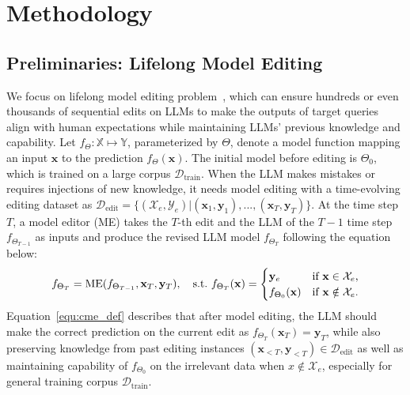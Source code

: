 \section{Methodology}\label{sec:method}

\subsection{Preliminaries: Lifelong Model Editing}
We focus on lifelong model editing problem~\cite{grace,t-patcher}, which can ensure hundreds or even thousands of sequential edits on LLMs to make the outputs of target queries align with human expectations while maintaining LLMs' previous knowledge and capability. 
Let $f_{\Theta}: \mathbb{X} \mapsto \mathbb{Y}$, parameterized by $\Theta$, denote a model function mapping an input $\mathbf{x}$ to the prediction $f_{\Theta}(\mathbf{x})$.
The initial model before editing is $\Theta_0$, which is trained on a large corpus $\mathcal{D}_{\text{train}}$. 
When the LLM makes mistakes or requires injections of new knowledge, it needs model editing with a time-evolving editing dataset as $\mathcal{D}_{\text{edit}}= \{(\mathcal{X}_e, \mathcal{Y}_e) \vert (\mathbf{x}_1, \mathbf{y}_1), ..., (\mathbf{x}_T, \mathbf{y}_T)\}$. 
At the time step $T$, a model editor (ME) takes the $T$-th edit and the LLM of the $T-1$ time step $f_{\Theta_{T-1}}$ as inputs and produce the revised LLM model $f_{\Theta_T}$ following the equation below:
\begin{equation}
 \label{equ:cme_def}
    f_{\Theta_{T}}={\rm ME}(f_{\Theta_{T-1}},\mathbf{x}_T,\mathbf{y}_T), \quad \text{s.t.}\
    f_{\Theta_{T}}(\mathbf{x}) = 
   \begin{cases}
    \mathbf{y}_e &\mbox{if $\mathbf{x} \in \mathcal{X}_e$,}\\
    f_{\Theta_0}(\mathbf{x})&\mbox{if $\mathbf{x} \notin \mathcal{X}_e$.}
    \end{cases}
\end{equation}
Equation~\ref{equ:cme_def} describes that after model editing, the LLM should make the correct prediction on the current edit as $f_{\Theta_{T}}(\mathbf{x}_T) = \mathbf{y}_T$, while also preserving knowledge from past editing instances $(\mathbf{x}_{<T}, \mathbf{y}_{<T}) \in \mathcal{D}_{\text{edit}}$ as well as maintaining capability of $f_{\Theta_0}$ on the irrelevant data when $x \notin \mathcal{X}_e$, especially for general training corpus $\mathcal{D}_{\text{train}}$.

